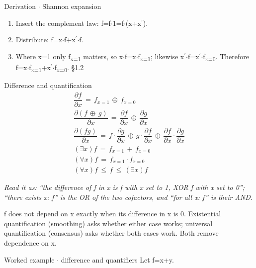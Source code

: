 \documentclass[11pt]{article}
\begin{document}
\begin{keepsection}
\begin{keepsection}
\begin{workedbox}{Derivation \ensuremath{\cdot} Shannon expansion}
\begin{enumerate}
\item Insert the complement law: f=f\ensuremath{\cdot}1=f\ensuremath{\cdot}(x+x\ensuremath{{}^{\prime}}).
\item Distribute: f=x\ensuremath{\cdot}f+x\ensuremath{{}^{\prime}}\ensuremath{\cdot}f.
\item Where x=1 only f\textsubscript{x=1} matters, so x\ensuremath{\cdot}f=x\ensuremath{\cdot}f\textsubscript{x=1}; likewise x\ensuremath{{}^{\prime}}\ensuremath{\cdot}f=x\ensuremath{{}^{\prime}}\ensuremath{\cdot}f\textsubscript{x=0}. Therefore f=x\ensuremath{\cdot}f\textsubscript{x=1}+x\ensuremath{{}^{\prime}}\ensuremath{\cdot}f\textsubscript{x=0}. \hfill{\small\color{FAUblue}§1.2}
\end{enumerate}
\end{workedbox}

\begin{equationcard}{Difference and quantification}
\[ \begin{gathered} \dfrac{∂{f}}{∂{x}}\, =\, {f}_{{x}=1}\, ⊕\, {f}_{{x}=0} \\ \dfrac{∂({f}\, ⊕\, {g})}{∂{x}}\, =\, \dfrac{∂{f}}{∂{x}}\, ⊕\, \dfrac{∂{g}}{∂{x}} \\ \dfrac{∂({f}{g})}{∂{x}}\, =\, {f}\cdot \dfrac{∂{g}}{∂{x}}\, ⊕\, {g}\cdot \dfrac{∂{f}}{∂{x}}\, ⊕\, \dfrac{∂{f}}{∂{x}}\cdot \dfrac{∂{g}}{∂{x}} \\ (\exists {x}){f}\, =\, {f}_{{x}=1}\, +\, {f}_{{x}=0} \\ (\forall {x}){f}\, =\, {f}_{{x}=1}\cdot {f}_{{x}=0} \\ (\forall {x}){f}\, \leq \, {f}\, \leq \, (\exists {x}){f} \end{gathered} \]
{\small \emph{Read it as: “the difference of f in x is f with x set to 1, XOR f with x set to 0”; “there exists x: f” is the OR of the two cofactors, and “for all x: f” is their AND.}\par f does not depend on x exactly when its difference in x is 0. Existential quantification (smoothing) asks whether either case works; universal quantification (consensus) asks whether both cases work. Both remove dependence on x.}
\end{equationcard}

\begin{workedbox}{Worked example \ensuremath{\cdot} difference and quantifiers}
Let f=x+y.


\end{workedbox}
\end{keepsection}
\end{keepsection}
\end{document}
